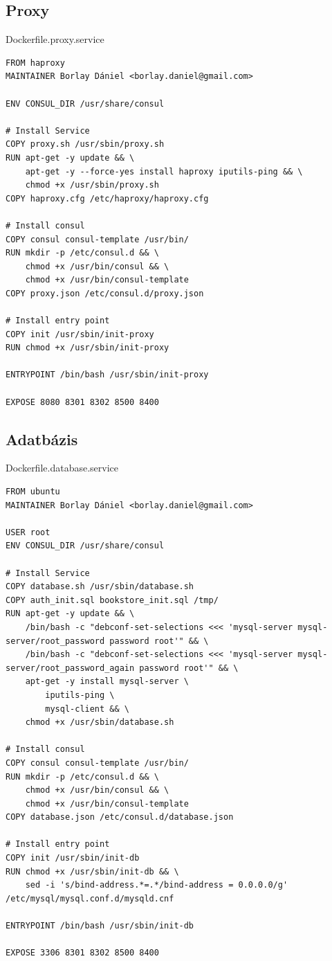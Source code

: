 \documentclass[11pt,magyar,a4paper,twoside,]{report}
\begin{document}
\subsection{Proxy}\label{proxy}

Dockerfile.proxy.service

\begin{verbatim}
FROM haproxy
MAINTAINER Borlay Dániel <borlay.daniel@gmail.com>

ENV CONSUL_DIR /usr/share/consul

# Install Service
COPY proxy.sh /usr/sbin/proxy.sh
RUN apt-get -y update && \
    apt-get -y --force-yes install haproxy iputils-ping && \
    chmod +x /usr/sbin/proxy.sh
COPY haproxy.cfg /etc/haproxy/haproxy.cfg

# Install consul
COPY consul consul-template /usr/bin/
RUN mkdir -p /etc/consul.d && \
    chmod +x /usr/bin/consul && \
    chmod +x /usr/bin/consul-template
COPY proxy.json /etc/consul.d/proxy.json

# Install entry point
COPY init /usr/sbin/init-proxy
RUN chmod +x /usr/sbin/init-proxy

ENTRYPOINT /bin/bash /usr/sbin/init-proxy

EXPOSE 8080 8301 8302 8500 8400
\end{verbatim}

\subsection{Adatbázis}\label{adatbuxe1zis}

Dockerfile.database.service

\begin{verbatim}
FROM ubuntu
MAINTAINER Borlay Dániel <borlay.daniel@gmail.com>

USER root
ENV CONSUL_DIR /usr/share/consul

# Install Service
COPY database.sh /usr/sbin/database.sh
COPY auth_init.sql bookstore_init.sql /tmp/
RUN apt-get -y update && \
    /bin/bash -c "debconf-set-selections <<< 'mysql-server mysql-server/root_password password root'" && \
    /bin/bash -c "debconf-set-selections <<< 'mysql-server mysql-server/root_password_again password root'" && \
    apt-get -y install mysql-server \
        iputils-ping \
        mysql-client && \
    chmod +x /usr/sbin/database.sh

# Install consul
COPY consul consul-template /usr/bin/
RUN mkdir -p /etc/consul.d && \
    chmod +x /usr/bin/consul && \
    chmod +x /usr/bin/consul-template
COPY database.json /etc/consul.d/database.json

# Install entry point
COPY init /usr/sbin/init-db
RUN chmod +x /usr/sbin/init-db && \
    sed -i 's/bind-address.*=.*/bind-address = 0.0.0.0/g' /etc/mysql/mysql.conf.d/mysqld.cnf

ENTRYPOINT /bin/bash /usr/sbin/init-db

EXPOSE 3306 8301 8302 8500 8400
\end{verbatim}
\end{document}
